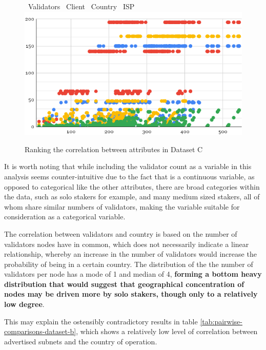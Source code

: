 \documentclass[conference]{IEEEtran}
\begin{document}
\vspace{4pt}

\begin{figure}[hbp]
    \centering
    \LARGE \textcolor{bluebullet}\textbullet\ \normalsize Validators %
    \LARGE \textcolor{redbullet}\textbullet\ \normalsize Client %
    \LARGE \textcolor{yellowbullet}\textbullet\ \normalsize Country %
    \LARGE \textcolor{greenbullet}\textbullet\ \normalsize ISP
    \includegraphics[width=1\linewidth]{figures/chart-3.png}
    \caption{Ranking the correlation between attributes in Dataset C}
    \label{fig:attribute-correlation-ranking-dataset-c}
\end{figure}

It is worth noting that while including the validator count as a variable in this analysis seems counter-intuitive due to the fact that is a continuous variable, as opposed to categorical like the other attributes, there are broad categories within the data, such as solo stakers for example, and many medium sized stakers, all of whom share similar numbers of validators, making the variable suitable for consideration as a categorical variable.

The correlation between validators and country is based on the number of validators nodes have in common, which does not necessarily indicate a linear relationship, whereby an increase in the number of validators would increase the probability of being in a certain country.  The distribution of the the number of validators per node has a mode of 1 and median of 4, \textbf{forming a bottom heavy distribution that would suggest that geographical concentration of nodes may be driven more by solo stakers, though only to a relatively low degree}.

This may explain the ostensibly contradictory results in table \ref{tab:pairwise-comparisons-dataset-b}, which shows a relatively low level of correlation between advertised subnets and the country of operation.
\end{document}
